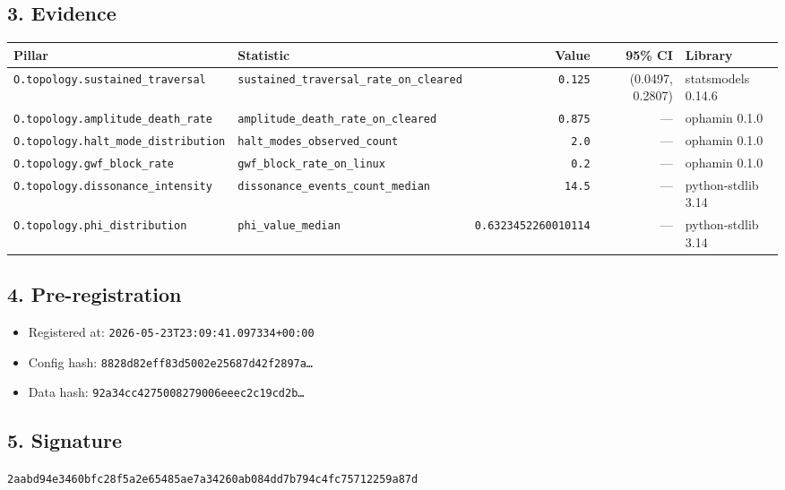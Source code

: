 \documentclass{article}
\begin{document}
\subsection*{3. Evidence}
\begin{tabular}{llrrl}\toprule
\textbf{Pillar} & \textbf{Statistic} & \textbf{Value} & \textbf{95\% CI} & \textbf{Library} \\\midrule
\texttt{O.topology.sustained\_traversal} & \texttt{sustained\_traversal\_rate\_on\_cleared} & \texttt{0.125} & (0.0497, 0.2807) & statsmodels 0.14.6 \\
\texttt{O.topology.amplitude\_death\_rate} & \texttt{amplitude\_death\_rate\_on\_cleared} & \texttt{0.875} & --- & ophamin 0.1.0 \\
\texttt{O.topology.halt\_mode\_distribution} & \texttt{halt\_modes\_observed\_count} & \texttt{2.0} & --- & ophamin 0.1.0 \\
\texttt{O.topology.gwf\_block\_rate} & \texttt{gwf\_block\_rate\_on\_linux} & \texttt{0.2} & --- & ophamin 0.1.0 \\
\texttt{O.topology.dissonance\_intensity} & \texttt{dissonance\_events\_count\_median} & \texttt{14.5} & --- & python-stdlib 3.14 \\
\texttt{O.topology.phi\_distribution} & \texttt{phi\_value\_median} & \texttt{0.6323452260010114} & --- & python-stdlib 3.14 \\
\bottomrule\end{tabular}
\subsection*{4. Pre-registration}
\begin{itemize}
\item Registered at: \texttt{2026-05-23T23:09:41.097334+00:00}
\item Config hash: \texttt{8828d82eff83d5002e25687d42f2897a\dots}
\item Data hash: \texttt{92a34cc4275008279006eeec2c19cd2b\dots}
\end{itemize}
\subsection*{5. Signature}
\texttt{2aabd94e3460bfc28f5a2e65485ae7a34260ab084dd7b794c4fc75712259a87d}\\
\end{document}
